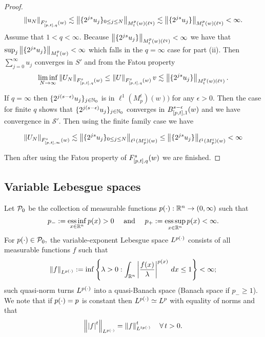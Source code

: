 {\begin{proof}
$$ \norm{u_N}{\itlw{[p,t]}{s}{q}{w}} \lesssim \norm{{\{2^{js}}u_j\}_{0\leq j\leq N} }{\mow{t}{p}{w}(\ell^q)} \lesssim \norm{{\{2^{js}}u_j\}}{\mow{t}{p}{w}(\ell^q)} <\infty.$$ Assume that $1<q<\infty$. Because $\norm{{\{2^{js}}u_j\}}{\mow{t}{p}{w}(\ell^q)} <\infty$ we have that $\sup_j\norm{{\{2^{js}}u_j\}}{\mow{t}{p}{w}} <\infty$ which falls in the $q=\infty$ case for part (ii). Then $\sum_{j=0}^\infty u_j$ converges in $S'$ and from the Fatou property 
\[\liminf_{N\rightarrow\infty} \norm{U_N}{\itlw{[p,t]}{s}{q}{w}} \leq \norm{U}{\itlw{[p,t]}{s}{q}{w}}v\lesssim \norm{{\{2^{js}}u_j\}}{\mow{t}{p}{w}(\ell^q)}. \]

If $q=\infty$ then $\{2^{j(s-\epsilon)}u_j\}_{j\in\naz}$ is in $\ell^1(M^t_p)(w))$ for any $\epsilon>0$. Then the case for finite $q$ shows that $\{2^{j(s-\epsilon)}u_j\}_{j\in\naz}$ converges in ${\ibesw{[p,t]}{s-\epsilon}{1}{w}}$ and we have convergence in $\mathcal{S}'$. Then using the finite family case we have 


\[ \norm{U_N}{F^s_{[p,t],\infty}(w)} \lesssim \norm{ \{ 2^{js}u_j \}_{0\leq j\leq N }}{\ell^1(M^t_p)(w)} \leq \norm{ \{ 2^{js}u_j \} }{\ell^1(M^t_p)(w)} < \infty \] 

 Then after using the Fatou property of  $\itlw{[p,t]}{s}{q}{w}$ we are finished.
\end{proof}
\subsection{Variable Lebesgue spaces}
 
 Let  $\P_0$ be the collection of  measurable functions $\pp : \rn \rightarrow (0,\infty)$  such that
\begin{equation*}
p_- := \essinf_{x\in \rn} p(x)>0 \quad\text{ and } \quad p_+ := \esssup_{x\in \rn} p(x)<\infty.
\end{equation*}
For $\pp\in\P_0,$   the variable-exponent Lebesgue space $\Lp$
consists of all measurable functions $f$ such that 
\begin{equation*}
\norm{f}{L^{p(\cdot)}}:=\inf\left\{\lambda>0: \int_{\rn} \abs{\frac{f(x)}{\lambda}}^{p(x)}\,dx\le 1\right\}<\infty;
\end{equation*}
such quasi-norm turns $\Lp$ into  a quasi-Banach  space (Banach space if $p_-\ge1$). 
We note that if $\pp=p$ is constant then  $\Lp\simeq L^p$ with equality of norms and that
\begin{equation}\label{eq:power}
\norm{\abs{f}^t}{\Lp}=\norm{f}{L^{t\pp}}^t\quad \forall\, t>0.
\end{equation} 

}
